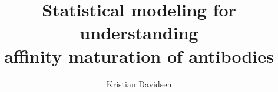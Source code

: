 % 
% 
%
%
%
%
%
%
%
% 
% 

\title{Statistical modeling for understanding \\affinity maturation of antibodies}

\author{Kristian Davidsen}



